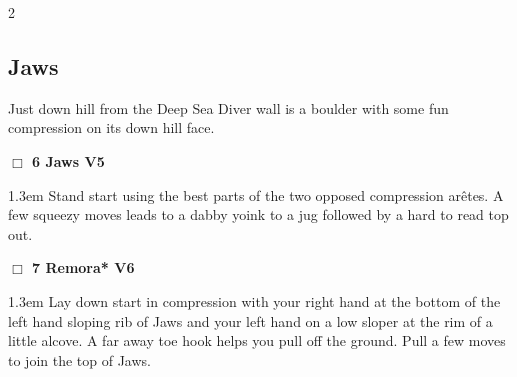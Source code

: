 \begin{multicols}{2}
\subsection*{Jaws}\label{bf:Jaws}
Just down hill from the Deep Sea Diver wall is a boulder with some fun compression on its down hill face.\\
\needspace{2em}
\label{rt:Jaws}
\colorbox{RoyalBlue!20}{
\parbox{0.95\linewidth}{
\hspace{-1ex}\textbf{$\Box$
6 Jaws V5  
}}}
\begin{adjustwidth}{1.3em}{}			
Stand start using the best parts of the two opposed compression arêtes. A few squeezy moves leads to a dabby yoink to a jug followed by a hard to read top out.
\end{adjustwidth}
\needspace{2em}
\label{rt:Remora}
\colorbox{RoyalBlue!20}{
\parbox{0.95\linewidth}{
\hspace{-1ex}\textbf{$\Box$
7 Remora* V6  
}}}
\begin{adjustwidth}{1.3em}{}			
Lay down start in compression with your right hand at the bottom of the left hand sloping rib of Jaws and your left hand on a low sloper at the rim of a little alcove. A far away toe hook helps you pull off the ground. Pull a few moves to join the top of Jaws.
\end{adjustwidth}
\needspace{10em}

\end{multicols}
